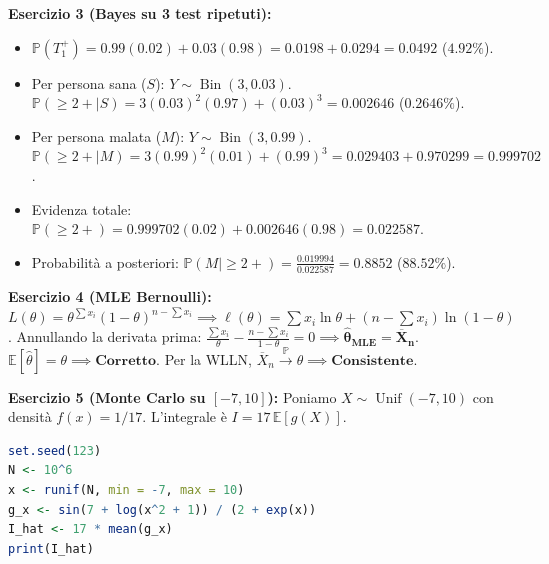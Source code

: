 \begin{dimostrazione}
\textbf{Esercizio 3 (Bayes su 3 test ripetuti):}
\begin{itemize}
    \item $\mathbb{P}(T_1^+) = 0.99(0.02) + 0.03(0.98) = 0.0198 + 0.0294 = \bm{0.0492}$ ($4.92\%$).
    \item Per persona sana ($S$): $Y \sim \operatorname{Bin}(3, 0.03)$.
    $\mathbb{P}(\ge 2 + \mid S) = 3(0.03)^2(0.97) + (0.03)^3 = \bm{0.002646}$ ($0.2646\%$).
    \item Per persona malata ($M$): $Y \sim \operatorname{Bin}(3, 0.99)$.
    $\mathbb{P}(\ge 2 + \mid M) = 3(0.99)^2(0.01) + (0.99)^3 = 0.029403 + 0.970299 = 0.999702$.
    \item Evidenza totale: $\mathbb{P}(\ge 2 +) = 0.999702(0.02) + 0.002646(0.98) = 0.022587$.
    \item Probabilità a posteriori: $\mathbb{P}(M \mid \ge 2 +) = \frac{0.019994}{0.022587} = \bm{0.8852}$ ($\bm{88.52\%}$).
\end{itemize}

\textbf{Esercizio 4 (MLE Bernoulli):}
$L(\theta) = \theta^{\sum x_i}(1-\theta)^{n-\sum x_i} \implies \ell(\theta) = \sum x_i \ln\theta + (n-\sum x_i)\ln(1-\theta)$.
Annullando la derivata prima: $\frac{\sum x_i}{\theta} - \frac{n-\sum x_i}{1-\theta} = 0 \implies \bm{\widehat{\theta}_{\text{MLE}} = \overline{X}_n}$.
$\mathbb{E}[\widehat{\theta}] = \theta \implies \textbf{Corretto}$. Per la WLLN, $\overline{X}_n \xrightarrow{\mathbb{P}} \theta \implies \textbf{Consistente}$.

\textbf{Esercizio 5 (Monte Carlo su $[-7, 10]$):}
Poniamo $X \sim \operatorname{Unif}(-7, 10)$ con densità $f(x) = 1/17$. L'integrale è $I = 17 \, \mathbb{E}[g(X)]$.
\begin{lstlisting}[language=R]
set.seed(123)
N <- 10^6
x <- runif(N, min = -7, max = 10)
g_x <- sin(7 + log(x^2 + 1)) / (2 + exp(x))
I_hat <- 17 * mean(g_x)
print(I_hat)
\end{lstlisting}
\end{dimostrazione}

